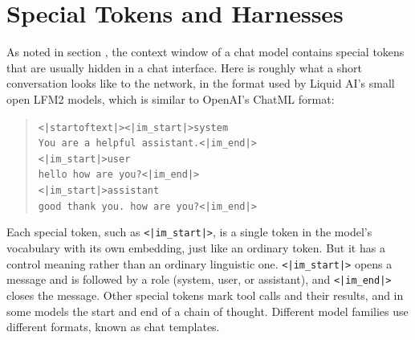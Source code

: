 
 

\section{Special Tokens and Harnesses}\label{specialTokens}

As noted in section , the context window of a chat model
contains special tokens that are usually hidden in a chat interface. Here is
roughly what a short conversation looks like to the network, in the format used
by Liquid AI's small open LFM2 models, which is similar to OpenAI's ChatML
format:

\begin{quote}
\texttt{<|startoftext|><|im\_start|>system}\\
\texttt{You are a helpful assistant.<|im\_end|>}\\
\texttt{<|im\_start|>user}\\
\texttt{hello how are you?<|im\_end|>}\\
\texttt{<|im\_start|>assistant}\\
\texttt{good thank you. how are you?<|im\_end|>}
\end{quote}

Each special token, such as \texttt{<|im\_start|>}, is a single token in the
model's vocabulary with its own embedding, just like an ordinary token. But it has a
control meaning rather than an ordinary linguistic one. \texttt{<|im\_start|>}
opens a message and is followed by a role (system, user, or assistant), and
\texttt{<|im\_end|>} closes the message. Other special tokens mark tool calls
and their results, and in some models the start and end of a chain of thought.
Different model families use different formats, known as chat templates.

